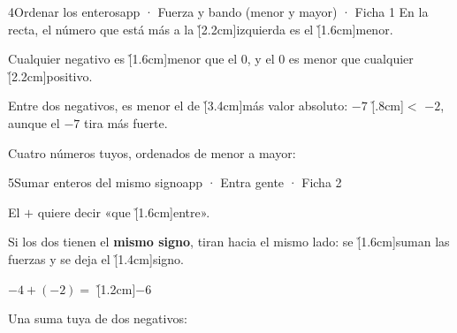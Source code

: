 \documentclass[12pt]{article}
\begin{document}
\begin{cromo}{4}{Ordenar los enteros}{app · Fuerza y bando (menor y mayor) · Ficha 1}
\completa En la recta, el número que está más a la \h[2.2cm]{izquierda} es el \h[1.6cm]{menor}.\par\vspace{2mm}
Cualquier negativo es \h[1.6cm]{menor} que el 0, y el 0 es menor que cualquier \h[2.2cm]{positivo}.\par\vspace{2mm}
Entre dos negativos, es menor el de \h[3.4cm]{más valor absoluto}: $-7$ \h[.8cm]{$<$} $-2$, aunque el $-7$ tira más fuerte.

\vspace{2mm}
\centerline{}

\vspace{1mm}
\tuejemplo Cuatro números tuyos, ordenados de menor a mayor:
\end{cromo}

\begin{cromo}{5}{Sumar enteros del mismo signo}{app · Entra gente · Ficha 2}
\begin{minipage}[c]{.58\linewidth}\raggedright
\completa El $+$ quiere decir «que \h[1.6cm]{entre}».\par\vspace{2mm}
Si los dos tienen el \textbf{mismo signo}, tiran hacia el mismo lado: se \h[1.6cm]{suman} las fuerzas y se deja el \h[1.4cm]{signo}.\par\vspace{2mm}
$-4 + (-2) =$ \h[1.2cm]{$-6$}
\end{minipage}%
\begin{minipage}[c]{.42\linewidth}\centering{}\end{minipage}

\vspace{2mm}
\tuejemplo Una suma tuya de dos negativos:
\end{cromo}
\end{document}
